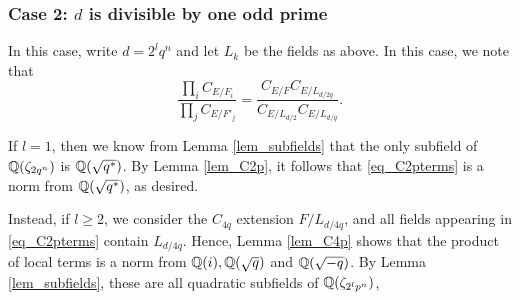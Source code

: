 \subsubsection*{Case 2: $d$ is divisible by one odd prime}
In this case, write $d=2^lq^n$ and let $L_k$ be the fields as above. In this case, we note that
\begin{equation}\label{eq_C2pterms}
    \frac{\prod_i C_{E/F_i}}{\prod_j C_{E/F'_j}}=\frac{C_{E/F}C_{E/L_{d/2q}}}{C_{E/L_{d/2}}C_{E/L_{d/q}}}.
\end{equation} 

If $l=1$, then we know from Lemma \ref{lem_subfields} that the only subfield of $\mathbb{Q}(\zeta_{2q^n})$ is $\mathbb{Q}(\sqrt{q^*})$. By Lemma \ref{lem_C2p}, it follows that \eqref{eq_C2pterms} is a norm from $\mathbb{Q}(\sqrt{q^*})$, as desired.

Instead, if $l\geq2$, we consider the $C_{4q}$ extension $F/L_{d/4q}$, and all fields appearing in \eqref{eq_C2pterms} contain $L_{d/4q}$. Hence, Lemma \ref{lem_C4p} shows that the product of local terms is a norm from $\mathbb{Q}(i), \mathbb{Q}(\sqrt{q})$ and $\mathbb{Q}(\sqrt{-q})$. By Lemma \ref{lem_subfields}, these are all quadratic subfields of $\mathbb{Q}(\zeta_{2^lp^n})$, 

